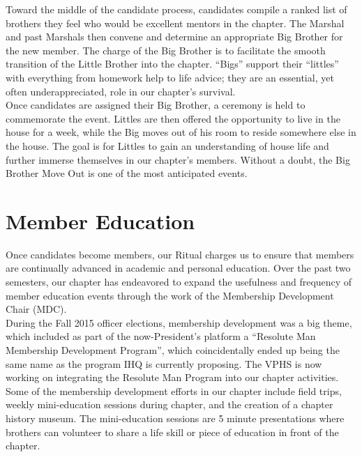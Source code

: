    Toward the middle of the candidate process, candidates compile a ranked list of brothers they feel who would be excellent mentors in the chapter. The Marshal and past Marshals then convene and determine an appropriate Big Brother for the new member. The charge of the Big Brother is to facilitate the smooth transition of the Little Brother into the chapter. ``Bigs'' support their ``littles'' with everything from homework help to life advice; they are an essential, yet often underappreciated, role in our chapter’s survival. \\
    
    Once candidates are assigned their Big Brother, a ceremony is held to commemorate the event. Littles are then offered the opportunity to live in the house for a week, while the Big moves out of his room to reside somewhere else in the house. The goal is for Littles to gain an understanding of house life and further immerse themselves in our chapter’s members. Without a doubt, the Big Brother Move Out is one of the most anticipated events. 
   
  \section*{Member Education}
      Once candidates become members, our Ritual charges us to ensure that members are continually advanced in academic and personal education. Over the past two semesters, our chapter has endeavored to expand the usefulness and frequency of member education events through the work of the Membership Development Chair (MDC). \\
      
      During the Fall 2015 officer elections, membership development was a big theme, which included as part of the now-President's platform a ``Resolute Man Membership Development Program'', which coincidentally ended up being the same name as the program IHQ is currently proposing. The VPHS is now working on integrating the Resolute Man Program into our chapter activities.\\
      
      Some of the membership development efforts in our chapter include field trips, weekly mini-education sessions during chapter, and the creation of a chapter history museum. The mini-education sessions are 5 minute presentations where brothers can volunteer to share a life skill or piece of education in front of the chapter. \\
      

